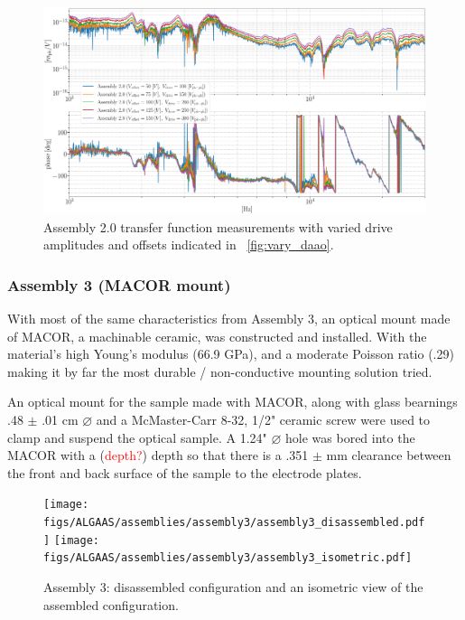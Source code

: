 \begin{figure}[H]
    \includegraphics[width=\textwidth]{figs/ALGAAS/results_figs/assembly2/vvao517.pdf} 
    \caption{Assembly 2.0 transfer function measurements with varied drive amplitudes and offsets indicated in ~\ref{fig:vary_daao}.}
    \label{fig:vvao517}
\end{figure}

\subsubsection{Assembly 3 (MACOR mount)}
With most of the same characteristics from Assembly 3, an optical mount made of MACOR, a machinable ceramic, was constructed and installed. With the material's high Young's modulus (66.9 GPa), and a moderate Poisson ratio (.29) \cite{macor} making it by far the most durable / non-conductive mounting solution tried.

An optical mount for the sample made with MACOR, along with glass bearnings .48 $\pm$ .01 cm $\diameter$  and a McMaster-Carr 8-32, 1/2" ceramic screw were used to clamp and suspend the optical sample. A 1.24" $\diameter$ hole was bored into the MACOR with a (\textcolor{red}{depth?}) depth so that there is a .351 $\pm$ mm clearance between the front and back surface of the sample to the electrode plates.

\begin{figure}[!ht]
    \begin{subcaptiongroup}
	    \texttt{[image: figs/ALGAAS/assemblies/assembly3/assembly3\_disassembled.pdf]}
	    \label{A3_disassembled}
	    \texttt{[image: figs/ALGAAS/assemblies/assembly3/assembly3\_isometric.pdf]}
	    \label{A3_isometric}
    \end{subcaptiongroup}
    \caption{Assembly 3:  disassembled configuration and  an isometric view of the assembled configuration.}
    \label{fig:assembly3}
\end{figure}


